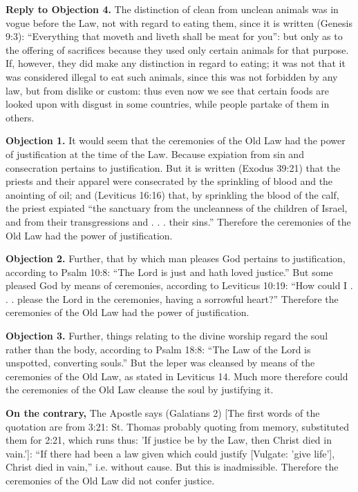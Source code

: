 \textbf{Reply to Objection 4.} The distinction of clean from unclean animals was in vogue before the Law, not with regard to eating them, since it is written (Genesis 9:3): ``Everything that moveth and liveth shall be meat for you'': but only as to the offering of sacrifices because they used only certain animals for that purpose. If, however, they did make any distinction in regard to eating; it was not that it was considered illegal to eat such animals, since this was not forbidden by any law, but from dislike or custom: thus even now we see that certain foods are looked upon with disgust in some countries, while people partake of them in others.


\textbf{Objection 1.} It would seem that the ceremonies of the Old Law had the power of justification at the time of the Law. Because expiation from sin and consecration pertains to justification. But it is written (Exodus 39:21) that the priests and their apparel were consecrated by the sprinkling of blood and the anointing of oil; and (Leviticus 16:16) that, by sprinkling the blood of the calf, the priest expiated ``the sanctuary from the uncleanness of the children of Israel, and from their transgressions and . . . their sins.'' Therefore the ceremonies of the Old Law had the power of justification.

\textbf{Objection 2.} Further, that by which man pleases God pertains to justification, according to Psalm 10:8: ``The Lord is just and hath loved justice.'' But some pleased God by means of ceremonies, according to Leviticus 10:19: ``How could I . . . please the Lord in the ceremonies, having a sorrowful heart?'' Therefore the ceremonies of the Old Law had the power of justification.

\textbf{Objection 3.} Further, things relating to the divine worship regard the soul rather than the body, according to Psalm 18:8: ``The Law of the Lord is unspotted, converting souls.'' But the leper was cleansed by means of the ceremonies of the Old Law, as stated in Leviticus 14. Much more therefore could the ceremonies of the Old Law cleanse the soul by justifying it.

\textbf{On the contrary,} The Apostle says (Galatians 2) [The first words of the quotation are from 3:21: St. Thomas probably quoting from memory, substituted them for 2:21, which runs thus: 'If justice be by the Law, then Christ died in vain.']: ``If there had been a law given which could justify [Vulgate: 'give life'], Christ died in vain,'' i.e. without cause. But this is inadmissible. Therefore the ceremonies of the Old Law did not confer justice.

